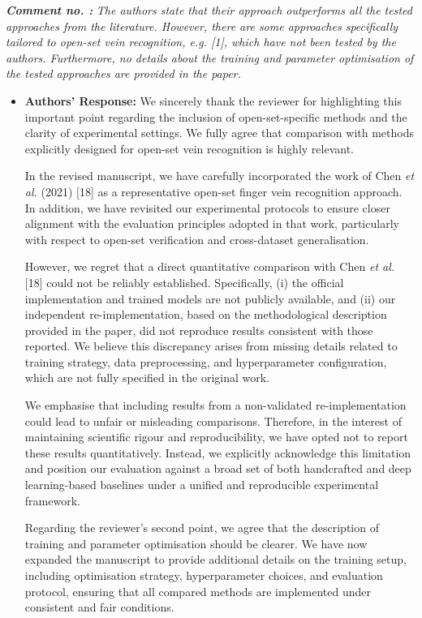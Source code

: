 \documentclass[11pt]{article}
\theoremstyle{remark}
\newcounter{mycounter} %
\newcommand\showReviewcounter{\stepcounter{mycounter}\themycounter}
\begin{document}
\color{blue} 
\textbf{\textit{Comment no. \showReviewcounter:}} 
\textit{The authors state that their approach outperforms all the tested approaches from the literature. However, there are some approaches specifically tailored to open-set vein recognition, e.g. [1], which have not been tested by the authors. Furthermore, no details about the training and parameter optimisation of the tested approaches are provided in the paper. }
\color{black}

\begin{itemize}
	\item \textbf{Authors' Response:} 
	We sincerely thank the reviewer for highlighting this important point regarding the inclusion of open-set-specific methods and the clarity of experimental settings. We fully agree that comparison with methods explicitly designed for open-set vein recognition is highly relevant.

	In the revised manuscript, we have carefully incorporated the work of Chen \emph{et al.} (2021) [18] as a representative open-set finger vein recognition approach. In addition, we have revisited our experimental protocols to ensure closer alignment with the evaluation principles adopted in that work, particularly with respect to open-set verification and cross-dataset generalisation.

	However, we regret that a direct quantitative comparison with Chen \emph{et al.} [18] could not be reliably established. Specifically, (i) the official implementation and trained models are not publicly available, and (ii) our independent re-implementation, based on the methodological description provided in the paper, did not reproduce results consistent with those reported. We believe this discrepancy arises from missing details related to training strategy, data preprocessing, and hyperparameter configuration, which are not fully specified in the original work.

	We emphasise that including results from a non-validated re-implementation could lead to unfair or misleading comparisons. Therefore, in the interest of maintaining scientific rigour and reproducibility, we have opted not to report these results quantitatively. Instead, we explicitly acknowledge this limitation and position our evaluation against a broad set of both handcrafted and deep learning-based baselines under a unified and reproducible experimental framework.

	Regarding the reviewer’s second point, we agree that the description of training and parameter optimisation should be clearer. We have now expanded the manuscript to provide additional details on the training setup, including optimisation strategy, hyperparameter choices, and evaluation protocol, ensuring that all compared methods are implemented under consistent and fair conditions.


\end{itemize}
\end{document}

